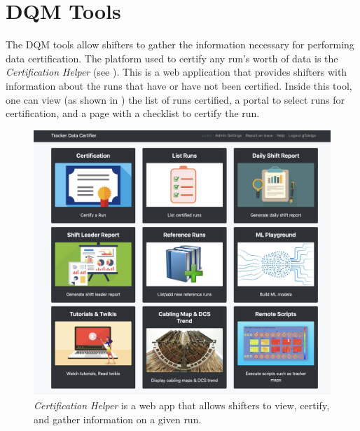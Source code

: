 \section{DQM Tools}
The DQM tools allow shifters to gather the information necessary for performing data certification. The platform used to certify any run's worth of data is the \textit{Certification Helper} (see ). This is a web application that provides shifters with information about the runs that have or have not been certified.
Inside this tool, one can view (as shown in ) the list of runs certified, a portal to select runs for certification, and a page with a checklist to certify the run.

\begin{figure}
	\centering
	\includegraphics[width=.75\linewidth]{Images/certhelper-menu.png}
	\caption{\textit{Certification Helper} is a web app that allows shifters to view, certify, and gather information on a given run.}
	\label{fig:certhelper}
\end{figure}

